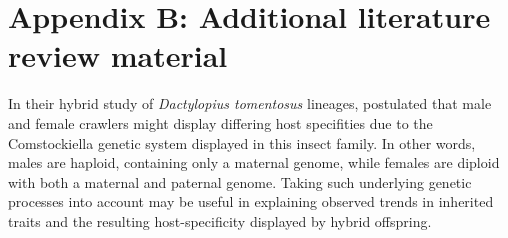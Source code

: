 \renewcommand{\chaptername}{}

\setcounter{table}{0}
\renewcommand{\thetable}{B\arabic{table}}

\setcounter{figure}{0}
\renewcommand{\thefigure}{B\arabic{figure}}

\chapter{Appendix B: Additional literature review material} 
\label{sec:appendix2}

In their hybrid study of \textit{Dactylopius tomentosus} lineages, \citet{Mathenge2010} postulated that male and female crawlers might display differing host specifities due to the Comstockiella genetic system displayed in this insect family. In other words, males are haploid, containing only a maternal genome, while females are diploid with both a maternal and paternal genome. Taking such underlying genetic processes into account may be useful in explaining observed trends in inherited traits and the resulting host-specificity displayed by hybrid offspring. 

